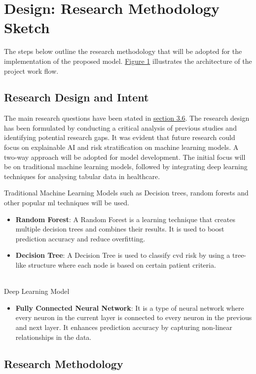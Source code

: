 \section{Design: Research Methodology Sketch}
\label{sec:methods}
The steps below outline the research methodology that will be adopted for the implementation of the proposed model. \hyperref[fig:image_label]{Figure 1} illustrates the architecture of the project work flow.

\subsection{Research Design and Intent }
The main research questions have been stated in \hyperref[subsec: research qs]{section 3.6}. The research design has been formulated by conducting a critical analysis of previous studies and identifying potential research gaps. It was evident that future research could focus on explainable AI and risk stratification on machine learning models. A two-way approach will be adopted for model development. The initial focus will be on traditional machine learning models, followed by integrating deep learning techniques for analysing tabular data in healthcare.

Traditional Machine Learning Models such as Decision trees, random forests and other popular \gls{ml} techniques will be used. 
\begin{itemize}
    \item \textbf{Random Forest}: A Random Forest is a learning technique that creates multiple decision trees and combines their results. It is used to boost prediction accuracy and reduce overfitting. 
    \item \textbf{Decision Tree}: A Decision Tree is used to classify \gls{cvd} risk by using a tree-like structure where each node is based on certain patient criteria.
\end{itemize}
\\

Deep Learning Model
\begin{itemize}
    \item \textbf{Fully Connected Neural Network}: It is a type of neural network where every neuron in the current layer is connected to every neuron in the previous and next layer. It enhances prediction accuracy by capturing non-linear relationships in the data. \citep{geeksforgeeks_fully_connected_layer}
\end{itemize}

\subsection{Research Methodology}
